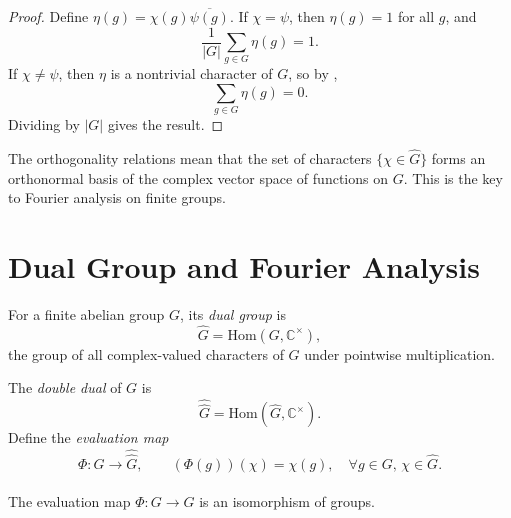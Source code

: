 \begin{proof}
Define $\eta(g)=\chi(g)\overline{\psi(g)}$.  
If $\chi=\psi$, then $\eta(g)=1$ for all $g$, and
\[
\frac{1}{|G|}\sum_{g\in G}\eta(g)=1.
\]
If $\chi\ne\psi$, then $\eta$ is a nontrivial character of $G$, so by ,
\[
\sum_{g\in G}\eta(g)=0.
\]
Dividing by $|G|$ gives the result.
\end{proof}

\begin{remark}
The orthogonality relations mean that the set of characters $\{\chi\in\widehat{G}\}$ forms an orthonormal basis of the complex vector space of functions on $G$.  
This is the key to Fourier analysis on finite groups.
\end{remark}

\begin{center}
\end{center}

\section{Dual Group and Fourier Analysis}

\begin{definition}\label{def:dual_group}
For a finite abelian group $G$, its \emph{dual group} is
\[
\widehat{G} = \mathrm{Hom}(G, \mathbb{C}^\times),
\]
the group of all complex-valued characters of $G$ under pointwise multiplication.
\end{definition}

\begin{definition}\label{def:double_dual}
The \emph{double dual} of $G$ is
\[
\widehat{\widehat{G}} = \mathrm{Hom}(\widehat{G}, \mathbb{C}^\times).
\]
Define the \emph{evaluation map}
\[
\Phi: G \longrightarrow \widehat{\widehat{G}}, \qquad
(\Phi(g))(\chi) = \chi(g), \quad \forall g\in G,\,\chi\in\widehat{G}.
\]
\end{definition}

\begin{theorem}\label{thm:pontryagin}
The evaluation map $\Phi:G\to\widehat{\widehat{G}}$ is an isomorphism of groups.
\end{theorem}

